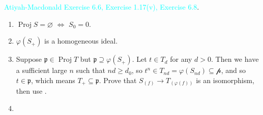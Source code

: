 \begin{exercise}\label{ex2.13}
	\textcolor{cyan}{Atiyah-Macdonald Exercise 6.6, Exercise 1.17(v), Exercise 6.8}.
\end{exercise}

\begin{exercise}\label{ex2.14}
	\begin{enumerate}[label=(\alph*),ref=\theexercise(\alph*)]
		\item\label{ex2.14.1} $\operatorname{Proj}S=\varnothing$ $\Leftrightarrow$ $S_0=0$.
		\item\label{ex2.14.2} $\varphi\!\left(S_+\right)$ is a homogeneous ideal.
		\item\label{ex2.14.3} Suppose $\mathfrak{p}\in\operatorname{Proj}T$ but $\mathfrak{p}\supseteq\varphi\!\left(S_+\right)$. Let $t\in T_d$ for any $d>0$. Then we have a sufficient large $n$ such that $nd\geqslant d_0$, so $t^n\in T_{nd}=\varphi\!\left(S_{nd}\right)\subseteq\mathcal{p}$, and so $t\in\mathfrak{p}$, which means $T_+\subseteq\mathfrak{p}$. Prove that $S_{(f)}\rightarrow T_{(\varphi(f))}$ is an isomorphism, then use .
		\item\label{ex2.14.4} 
	\end{enumerate}
\end{exercise}

\begin{exercise}\label{ex2.15}
	
\end{exercise}

